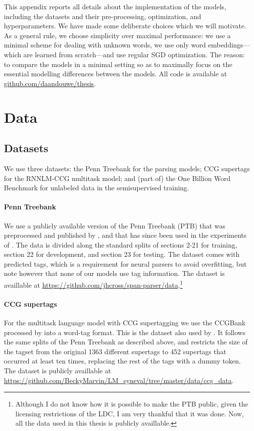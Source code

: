 This appendix reports all details about the implementation of the models, including the datasets and their pre-processing, optimization, and hyperparameters. We have made some deliberate choices which we will motivate. As a general rule, we choose simplicity over maximal performance: we use a minimal scheme for dealing with unknown words, we use only word embeddings---which are learned from scratch---and use regular SGD optimization. The reason: to compare the models in a minimal setting so as to maximally focus on the essential modelling differences between the models. All code is available at \url{github.com/daandouwe/thesis}.

\section{Data}

  \subsection{Datasets}
    We use three datasets: the Penn Treebank for the parsing models; CCG supertags for the RNNLM-CCG multitask model; and (part of) the One Billion Word Benchmark for unlabeled data in the semisupervised training.

    \paragraph{Penn Treebank}
    We use a publicly available version of the Penn Treebank (PTB) that was preprocessed and published by \citet{cross2016span}, and that has since been used in the experiments of \citet{stern2017minimal,kitaev2018attentive}. The data is divided along the standard splits of sections 2-21 for training, section 22 for development, and section 23 for testing. The dataset comes with predicted tags, which is a requirement for neural parsers to avoid overfitting, but note however that none of our models use tag information. The dataset is availlable at \url{https://github.com/jhcross/span-parser/data}.\footnote{Although I do not know how it is possible to make the PTB public, given the licensing restrictions of the LDC, I am very thankful that it was done. Now, all the data used in this thesis is publicly availlable.}

    \paragraph{CCG supertags}
    For the multitask language model with CCG supertagging we use the CCGBank \citep{hockenmaier2007ccgbank} processed by \citet{enguehard2017multitask} into a word-tag format. This is the dataset also used by \citet{linzen2018targeted}. It follows the same splits of the Penn Treebank as described above, and restricts the size of the tagset from the original 1363 different supertags to 452 supertags that occurred at least ten times, replacing the rest of the tags with a dummy token. The dataset is publicly availlable at \url{https://github.com/BeckyMarvin/LM_syneval/tree/master/data/ccg_data}.

